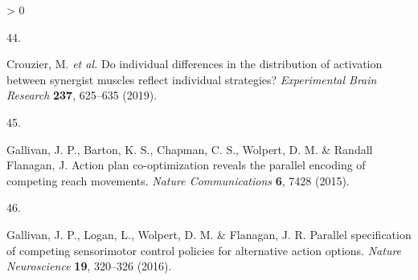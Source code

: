\documentclass[
  a4paper,
]{article}
\newlength{\cslhangindent}
\newlength{\csllabelwidth}
\newenvironment{CSLReferences}[2] %
 {%
  \setlength{\parindent}{0pt}
  \ifodd #1 \everypar{\setlength{\hangindent}{\cslhangindent}}\ignorespaces\fi
  \ifnum #2 > 0
  \setlength{\parskip}{#2\baselineskip}
  \fi
 }%
 {}
\newcommand{\CSLLeftMargin}[1]{\parbox[t]{\csllabelwidth}{#1}}
\newcommand{\CSLRightInline}[1]{\parbox[t]{\linewidth - \csllabelwidth}{#1}\break}
\begin{document}
\begin{CSLReferences}{0}{0}
\leavevmode\hypertarget{ref-crouzierIndividualDifferencesDistribution2019}{}%
\CSLLeftMargin{44. }
\CSLRightInline{Crouzier, M. \emph{et al.} Do individual differences in
the distribution of activation between synergist muscles reflect
individual strategies? \emph{Experimental Brain Research} \textbf{237},
625--635 (2019).}

\leavevmode\hypertarget{ref-gallivanActionPlanCooptimization2015}{}%
\CSLLeftMargin{45. }
\CSLRightInline{Gallivan, J. P., Barton, K. S., Chapman, C. S., Wolpert,
D. M. \& Randall Flanagan, J. Action plan co-optimization reveals the
parallel encoding of competing reach movements. \emph{Nature
Communications} \textbf{6}, 7428 (2015).}

\leavevmode\hypertarget{ref-gallivanParallelSpecificationCompeting2016}{}%
\CSLLeftMargin{46. }
\CSLRightInline{Gallivan, J. P., Logan, L., Wolpert, D. M. \& Flanagan,
J. R. Parallel specification of competing sensorimotor control policies
for alternative action options. \emph{Nature Neuroscience} \textbf{19},
320--326 (2016).}

\end{CSLReferences}
\end{document}
